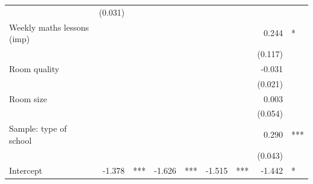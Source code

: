 \documentclass{article}
\begin{document}
\begin{table}[!h]
\begin{tabular}{lllllllll}
  \multicolumn{1}{l}{} &
  \multicolumn{1}{r}{(0.031)} &
  \multicolumn{1}{l}{} \\
\multicolumn{1}{l}{Weekly maths lessons (imp)} &
  \multicolumn{1}{r}{} &
  \multicolumn{1}{l}{} &
  \multicolumn{1}{r}{} &
  \multicolumn{1}{l}{} &
  \multicolumn{1}{r}{} &
  \multicolumn{1}{l}{} &
  \multicolumn{1}{r}{0.244} &
  \multicolumn{1}{l}{*} \\
\multicolumn{1}{l}{} &
  \multicolumn{1}{r}{} &
  \multicolumn{1}{l}{} &
  \multicolumn{1}{r}{} &
  \multicolumn{1}{l}{} &
  \multicolumn{1}{r}{} &
  \multicolumn{1}{l}{} &
  \multicolumn{1}{r}{(0.117)} &
  \multicolumn{1}{l}{} \\
\multicolumn{1}{l}{Room quality} &
  \multicolumn{1}{r}{} &
  \multicolumn{1}{l}{} &
  \multicolumn{1}{r}{} &
  \multicolumn{1}{l}{} &
  \multicolumn{1}{r}{} &
  \multicolumn{1}{l}{} &
  \multicolumn{1}{r}{-0.031} &
  \multicolumn{1}{l}{} \\
\multicolumn{1}{l}{} &
  \multicolumn{1}{r}{} &
  \multicolumn{1}{l}{} &
  \multicolumn{1}{r}{} &
  \multicolumn{1}{l}{} &
  \multicolumn{1}{r}{} &
  \multicolumn{1}{l}{} &
  \multicolumn{1}{r}{(0.021)} &
  \multicolumn{1}{l}{} \\
\multicolumn{1}{l}{Room size} &
  \multicolumn{1}{r}{} &
  \multicolumn{1}{l}{} &
  \multicolumn{1}{r}{} &
  \multicolumn{1}{l}{} &
  \multicolumn{1}{r}{} &
  \multicolumn{1}{l}{} &
  \multicolumn{1}{r}{0.003} &
  \multicolumn{1}{l}{} \\
\multicolumn{1}{l}{} &
  \multicolumn{1}{r}{} &
  \multicolumn{1}{l}{} &
  \multicolumn{1}{r}{} &
  \multicolumn{1}{l}{} &
  \multicolumn{1}{r}{} &
  \multicolumn{1}{l}{} &
  \multicolumn{1}{r}{(0.054)} &
  \multicolumn{1}{l}{} \\
\multicolumn{1}{l}{Sample: type of school} &
  \multicolumn{1}{r}{} &
  \multicolumn{1}{l}{} &
  \multicolumn{1}{r}{} &
  \multicolumn{1}{l}{} &
  \multicolumn{1}{r}{} &
  \multicolumn{1}{l}{} &
  \multicolumn{1}{r}{0.290} &
  \multicolumn{1}{l}{***} \\
\multicolumn{1}{l}{} &
  \multicolumn{1}{r}{} &
  \multicolumn{1}{l}{} &
  \multicolumn{1}{r}{} &
  \multicolumn{1}{l}{} &
  \multicolumn{1}{r}{} &
  \multicolumn{1}{l}{} &
  \multicolumn{1}{r}{(0.043)} &
  \multicolumn{1}{l}{} \\
\multicolumn{1}{l}{Intercept} &
  \multicolumn{1}{r}{-1.378} &
  \multicolumn{1}{l}{***} &
  \multicolumn{1}{r}{-1.626} &
  \multicolumn{1}{l}{***} &
  \multicolumn{1}{r}{-1.515} &
  \multicolumn{1}{l}{***} &
  \multicolumn{1}{r}{-1.442} &
  \multicolumn{1}{l}{*} \\

\end{tabular}
\end{table}
\end{document}
